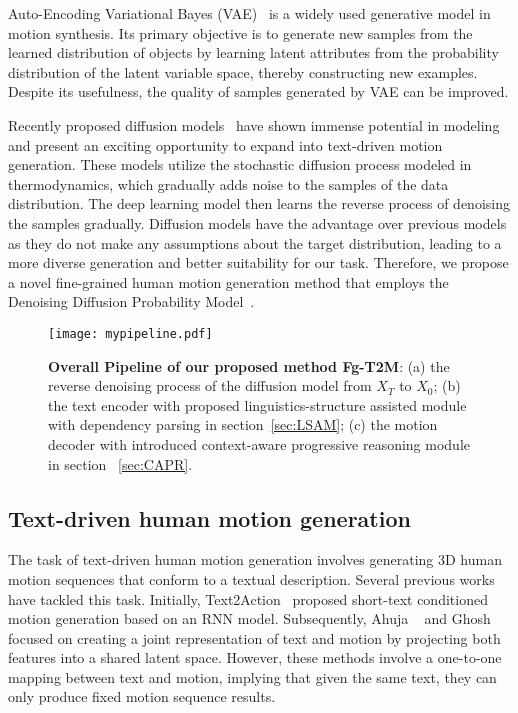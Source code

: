 \documentclass[10pt,twocolumn,letterpaper]{article}
\begin{document}
Auto-Encoding Variational Bayes (VAE)~\cite{kingma2013auto} is a widely used generative model in motion synthesis. Its primary objective is to generate new samples from the learned distribution of objects by learning latent attributes from the probability distribution of the latent variable space, thereby constructing new examples. Despite its usefulness, the quality of samples generated by VAE can be improved.

Recently proposed diffusion models~\cite{ho2020denoising,nichol2021improved,song2020denoising} have shown immense potential in modeling and present an exciting opportunity to expand into text-driven motion generation. These models utilize the stochastic diffusion process modeled in thermodynamics, which gradually adds noise to the samples of the data distribution. The deep learning model then learns the reverse process of denoising the samples gradually. Diffusion models have the advantage over previous models as they do not make any assumptions about the target distribution, leading to a more diverse generation and better suitability for our task. Therefore, we propose a novel fine-grained human motion generation method that employs the Denoising Diffusion Probability Model~\cite{ho2020denoising}.






\begin{figure*}[t]
    \centering
     \texttt{[image: mypipeline.pdf]}
    \caption{\textbf{Overall Pipeline of our proposed method Fg-T2M}: (a) the reverse denoising process of the diffusion model from $X_T$ to $X_0$; (b) the text encoder with proposed linguistics-structure assisted module with dependency parsing in section~\ref{sec:LSAM}; (c) the motion decoder with introduced context-aware progressive reasoning module in section ~\ref{sec:CAPR}.}
    \label{mypipeline}
\end{figure*}
\subsection{Text-driven human motion generation}
The task of text-driven human motion generation involves generating 3D human motion sequences that conform to a textual description. Several previous works have tackled this task. Initially, Text2Action~\cite{ahn2018text2action} proposed short-text conditioned motion generation based on an RNN model. Subsequently, Ahuja \etal~\cite{ahuja2019language2pose} and Ghosh \etal \cite{ghosh2021synthesis} focused on creating a joint representation of text and motion by projecting both features into a shared latent space. However, these methods involve a one-to-one mapping between text and motion, implying that given the same text, they can only produce fixed motion sequence results.
\end{document}
